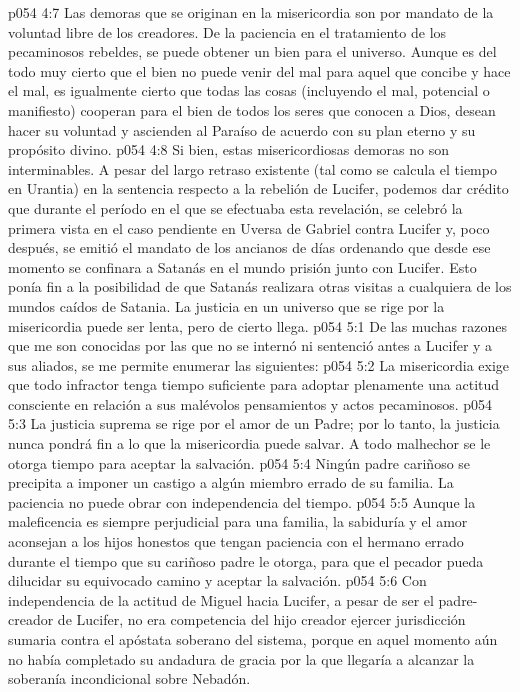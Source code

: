 \vs p054 4:7 Las demoras que se originan en la misericordia son por mandato de la voluntad libre de los creadores. De la paciencia en el tratamiento de los pecaminosos rebeldes, se puede obtener un bien para el universo. Aunque es del todo muy cierto que el bien no puede venir del mal para aquel que concibe y hace el mal, es igualmente cierto que todas las cosas (incluyendo el mal, potencial o manifiesto) cooperan para el bien de todos los seres que conocen a Dios, desean hacer su voluntad y ascienden al Paraíso de acuerdo con su plan eterno y su propósito divino.
\vs p054 4:8 Si bien, estas misericordiosas demoras no son interminables. A pesar del largo retraso existente (tal como se calcula el tiempo en Urantia) en la sentencia respecto a la rebelión de Lucifer, podemos dar crédito que durante el período en el que se efectuaba esta revelación, se celebró la primera vista en el caso pendiente en Uversa de Gabriel contra Lucifer y, poco después, se emitió el mandato de los ancianos de días ordenando que desde ese momento se confinara a Satanás en el mundo prisión junto con Lucifer. Esto ponía fin a la posibilidad de que Satanás realizara otras visitas a cualquiera de los mundos caídos de Satania. La justicia en un universo que se rige por la misericordia puede ser lenta, pero de cierto llega.
\vs p054 5:1 De las muchas razones que me son conocidas por las que no se internó ni sentenció antes a Lucifer y a sus aliados, se me permite enumerar las siguientes:
\vs p054 5:2 La misericordia exige que todo infractor tenga tiempo suficiente para adoptar plenamente una actitud consciente en relación a sus malévolos pensamientos y actos pecaminosos.
\vs p054 5:3 La justicia suprema se rige por el amor de un Padre; por lo tanto, la justicia nunca pondrá fin a lo que la misericordia puede salvar. A todo malhechor se le otorga tiempo para aceptar la salvación.
\vs p054 5:4 Ningún padre cariñoso se precipita a imponer un castigo a algún miembro errado de su familia. La paciencia no puede obrar con independencia del tiempo.
\vs p054 5:5 Aunque la maleficencia es siempre perjudicial para una familia, la sabiduría y el amor aconsejan a los hijos honestos que tengan paciencia con el hermano errado durante el tiempo que su cariñoso padre le otorga, para que el pecador pueda dilucidar su equivocado camino y aceptar la salvación.
\vs p054 5:6 Con independencia de la actitud de Miguel hacia Lucifer, a pesar de ser el padre\hyp{}creador de Lucifer, no era competencia del hijo creador ejercer jurisdicción sumaria contra el apóstata soberano del sistema, porque en aquel momento aún no había completado su andadura de gracia por la que llegaría a alcanzar la soberanía incondicional sobre Nebadón.
